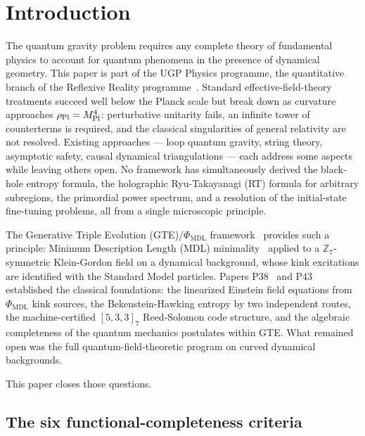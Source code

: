 \documentclass[11pt]{article}
\theoremstyle{remark}
\newcommand{\PHIMDL}{\Phi_{\mathrm{MDL}}}
\newcommand{\ZS}{\mathbb{Z}_7}
\newcommand{\MPl}{M_{\rm Pl}}
\newcommand{\rhoPl}{\rho_{\rm Pl}}
\begin{document}
\section{Introduction}
\label{sec:intro}

The quantum gravity problem requires any complete theory of fundamental physics to
account for quantum phenomena in the presence of dynamical geometry.
This paper is part of the UGP Physics programme, the quantitative branch of the
Reflexive Reality programme~\cite{SpivackResearchProgrammes}.  Standard
effective-field-theory treatments succeed well below the Planck scale but break down as
curvature approaches $\rhoPl = \MPl^4$: perturbative unitarity fails, an infinite tower
of counterterms is required, and the classical singularities of general relativity are
not resolved.  Existing approaches --- loop quantum gravity, string theory, asymptotic
safety, causal dynamical triangulations --- each address some aspects while leaving
others open.  No framework has simultaneously derived the black-hole entropy formula, the
holographic Ryu-Takayanagi (RT) formula for arbitrary subregions, the primordial power
spectrum, and a resolution of the initial-state fine-tuning problems, all from a single
microscopic principle.

The Generative Triple Evolution (GTE)/$\PHIMDL$ framework~\cite{Spivack2026_SM_UGP,SpivackPhiMDLGravity,SpivackCompleteness}
provides such a principle: Minimum Description Length (MDL) minimality~\cite{RissanenMDL,GrunwaldMDL} applied to a $\ZS$-symmetric Klein-Gordon
field on a dynamical background, whose kink excitations are identified with the Standard
Model particles.  Papers P38~\cite{SpivackPhiMDLGravity} and
P43~\cite{SpivackCompleteness} established the classical foundations: the linearized
Einstein field equations from $\PHIMDL$ kink sources, the Bekenstein-Hawking entropy by
two independent routes, the machine-certified $[5,3,3]_7$ Reed-Solomon code structure,
and the algebraic completeness of the quantum mechanics postulates within GTE.  What
remained open was the full quantum-field-theoretic program on curved dynamical
backgrounds.

This paper closes those questions.

\subsection*{The six functional-completeness criteria}
\end{document}
